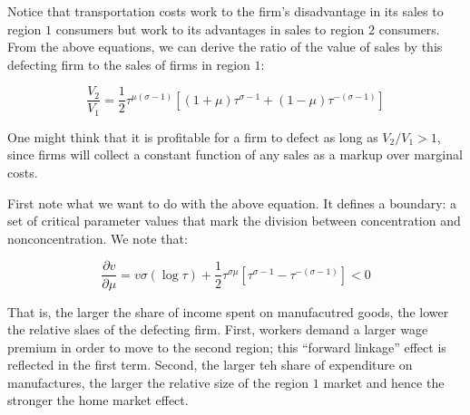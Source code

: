 Notice that transportation costs work to the firm's disadvantage in its sales to region $1$ consumers but work to its advantages in sales to region $2$ consumers. From the above equations, we can derive the ratio of the value of sales by this defecting firm to the sales of firms in region $1$:

\begin{equation}
  \frac{V_2}{V_1} = \frac{1}{2} \tau^{\mu(\sigma - 1)}\left[(1 + \mu)\tau^{\sigma - 1} + (1 - \mu)\tau^{-(\sigma - 1)}\right]
\end{equation}

One might think that it is profitable for a firm to defect as long as $V_2 / V_1 > 1$, since firms will collect a constant function of any sales as a markup over marginal costs.

First note what we want to do with the above equation. It defines a boundary: a set of critical parameter values that mark the division between concentration and nonconcentration. We note that:

\begin{equation}
  \frac{\partial v}{\partial \mu} = v\sigma (\log \tau) + \frac{1}{2} \tau^{\sigma \mu} [\tau^{\sigma - 1} - \tau^{-(\sigma - 1)}] < 0
\end{equation}

That is, the larger the share of income spent on manufacutred goods, the lower the relative slaes of the defecting firm. First, workers demand a larger wage premium in order to move to the second region; this ``forward linkage'' effect is reflected in the first term. Second, the larger teh share of expenditure on manufactures, the larger the relative size of the region $1$ market and hence the stronger the home market effect.